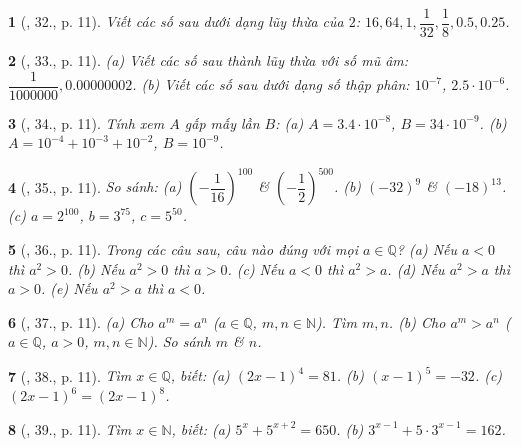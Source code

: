 \documentclass{article}
\newtheorem{baitoan}{}
\begin{document}
\begin{baitoan}[\cite{Binh_Toan_7_tap_1}, 32., p. 11]
	Viết các số sau dưới dạng lũy thừa của $2$: $16,64,1,\dfrac{1}{32},\dfrac{1}{8},0.5,0.25$.
\end{baitoan}

\begin{baitoan}[\cite{Binh_Toan_7_tap_1}, 33., p. 11]
	(a) Viết các số sau thành lũy thừa với số mũ âm: $\dfrac{1}{1000000},0.00000002$. (b) Viết các số sau dưới dạng số thập phân: $10^{-7}$, $2.5\cdot 10^{-6}$.
\end{baitoan}

\begin{baitoan}[\cite{Binh_Toan_7_tap_1}, 34., p. 11]
	Tính xem $A$ gấp mấy lần $B$: (a) $A = 3.4\cdot 10^{-8}$, $B = 34\cdot 10^{-9}$. (b) $A = 10^{-4} + 10^{-3} + 10^{-2}$, $B = 10^{-9}$.
\end{baitoan}

\begin{baitoan}[\cite{Binh_Toan_7_tap_1}, 35., p. 11]
	So sánh: (a) $\left(-\dfrac{1}{16}\right)^{100}$ \& $\left(-\dfrac{1}{2}\right)^{500}$. (b) $(-32)^9$ \& $(-18)^{13}$. (c) $a = 2^{100}$, $b = 3^{75}$, $c = 5^{50}$.
\end{baitoan}

\begin{baitoan}[\cite{Binh_Toan_7_tap_1}, 36., p. 11]
	Trong các câu sau, câu nào đúng với mọi $a\in\mathbb{Q}$? (a) Nếu $a < 0$ thì $a^2 > 0$. (b) Nếu $a^2 > 0$ thì $a > 0$. (c) Nếu $a < 0$ thì $a^2 > a$. (d) Nếu $a^2 > a$ thì $a > 0$. (e) Nếu $a^2 > a$ thì $a < 0$.
\end{baitoan}

\begin{baitoan}[\cite{Binh_Toan_7_tap_1}, 37., p. 11]
	(a) Cho $a^m = a^n$ ($a\in\mathbb{Q}$, $m,n\in\mathbb{N}$). Tìm $m,n$. (b) Cho $a^m > a^n$ ($a\in\mathbb{Q}$, $a > 0$, $m,n\in\mathbb{N}$). So sánh $m$ \& $n$.
\end{baitoan}

\begin{baitoan}[\cite{Binh_Toan_7_tap_1}, 38., p. 11]
	Tìm $x\in\mathbb{Q}$, biết: (a) $(2x - 1)^4 = 81$. (b) $(x - 1)^5 = -32$. (c) $(2x - 1)^6 = (2x - 1)^8$.
\end{baitoan}

\begin{baitoan}[\cite{Binh_Toan_7_tap_1}, 39., p. 11]
	Tìm $x\in\mathbb{N}$, biết: (a) $5^x + 5^{x+2} = 650$. (b) $3^{x-1} + 5\cdot 3^{x-1} = 162$.
\end{baitoan}
\end{document}
